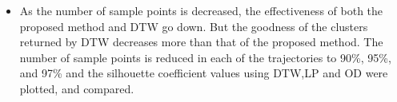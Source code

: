 \begin{itemize}
\item
As the number of sample points is decreased, the effectiveness of both the proposed method and DTW go down. But the goodness of the clusters returned by DTW decreases more than that of the proposed method. The number of sample points is reduced in each of the trajectories to 90\%, 95\%, and 97\% and the silhouette coefficient values using DTW,LP and OD were plotted, and compared. 
%
\end{itemize}


